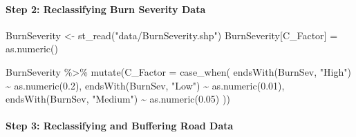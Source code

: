 \documentclass[
]{article}
\newenvironment{Shaded}{\begin{snugshade}}{\end{snugshade}}
\newcommand{\AttributeTok}[1]{\textcolor[rgb]{0.77,0.63,0.00}{#1}}
\newcommand{\DecValTok}[1]{\textcolor[rgb]{0.00,0.00,0.81}{#1}}
\newcommand{\FloatTok}[1]{\textcolor[rgb]{0.00,0.00,0.81}{#1}}
\newcommand{\FunctionTok}[1]{\textcolor[rgb]{0.00,0.00,0.00}{#1}}
\newcommand{\NormalTok}[1]{#1}
\newcommand{\OtherTok}[1]{\textcolor[rgb]{0.56,0.35,0.01}{#1}}
\newcommand{\SpecialCharTok}[1]{\textcolor[rgb]{0.00,0.00,0.00}{#1}}
\newcommand{\StringTok}[1]{\textcolor[rgb]{0.31,0.60,0.02}{#1}}
\begin{document}
\hypertarget{sec-step-2-reclassifying-burn-severity-data-c}{%
\paragraph*{Step 2: Reclassifying Burn Severity Data}\label{sec-step-2-reclassifying-burn-severity-data-c}}

\begin{Shaded}
\begin{Highlighting}[]
\NormalTok{BurnSeverity }\OtherTok{\textless{}{-}} \FunctionTok{st\_read}\NormalTok{(}\StringTok{"data/BurnSeverity.shp"}\NormalTok{)}
\NormalTok{BurnSeverity[}\StringTok{\textquotesingle{}C\_Factor\textquotesingle{}}\NormalTok{] }\OtherTok{=} \FunctionTok{as.numeric}\NormalTok{()}

\NormalTok{BurnSeverity }\SpecialCharTok{\%\textgreater{}\%}
  \FunctionTok{mutate}\NormalTok{(}\AttributeTok{C\_Factor =} \FunctionTok{case\_when}\NormalTok{(}
    \FunctionTok{endsWith}\NormalTok{(BurnSev, }\StringTok{"High"}\NormalTok{) }\SpecialCharTok{\textasciitilde{}} \FunctionTok{as.numeric}\NormalTok{(}\FloatTok{0.2}\NormalTok{), }
    \FunctionTok{endsWith}\NormalTok{(BurnSev, }\StringTok{"Low"}\NormalTok{) }\SpecialCharTok{\textasciitilde{}} \FunctionTok{as.numeric}\NormalTok{(}\FloatTok{0.01}\NormalTok{), }
    \FunctionTok{endsWith}\NormalTok{(BurnSev, }\StringTok{"Medium"}\NormalTok{) }\SpecialCharTok{\textasciitilde{}} \FunctionTok{as.numeric}\NormalTok{(}\FloatTok{0.05}\NormalTok{)}
\NormalTok{    ))}
\end{Highlighting}
\end{Shaded}

\hypertarget{step-3-reclassifying-and-buffering-road-data}{%
\paragraph*{Step 3: Reclassifying and Buffering Road Data}\label{step-3-reclassifying-and-buffering-road-data}}

\begin{Shaded}
\end{Shaded}
\end{document}
